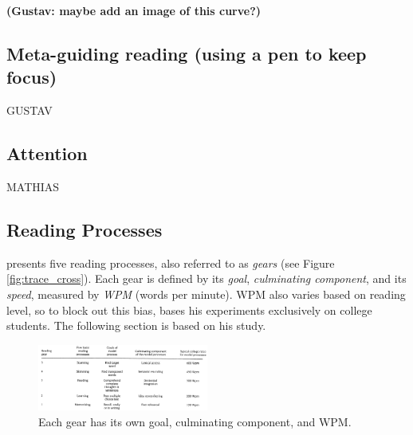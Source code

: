 \textbf{(Gustav: maybe add an image of this curve?)}

\subsection{Meta-guiding reading (using a pen to keep focus)}
GUSTAV

\subsection{Attention}
MATHIAS

\subsection{Reading Processes}
 presents five reading processes, also referred to as \textit{gears} (see Figure \ref{fig:trace_cross}). Each gear is defined by its \textit{goal}, \textit{culminating component}, and its \textit{speed}, measured by \textit{WPM} (words per minute). WPM also varies based on reading level, so to block out this bias, \citeauthor{carver_reading_1992} bases his experiments exclusively on college students. The following section is based on his study.

\begin{figure}[htbp]
\centering
\includegraphics[width=0.5\textwidth]{Pics/gears_list}
\caption{Each gear has its own goal, culminating component, and WPM.}
\label{fig:gears_list}
\end{figure}

